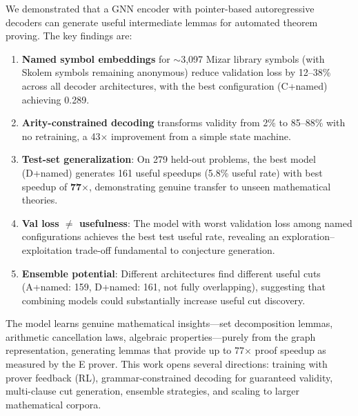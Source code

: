 \documentclass{article}
\begin{document}
We demonstrated that a GNN encoder with pointer-based autoregressive decoders can
generate useful intermediate lemmas for automated theorem proving. The key findings
are:

\begin{enumerate}
\item \textbf{Named symbol embeddings} for ${\sim}$3,097 Mizar library symbols
      (with Skolem symbols remaining anonymous) reduce validation loss by 12--38\%
      across all decoder architectures, with the best configuration (C+named)
      achieving 0.289.

\item \textbf{Arity-constrained decoding} transforms validity from 2\% to 85--88\%
      with no retraining, a 43$\times$ improvement from a simple state machine.

\item \textbf{Test-set generalization}: On 279 held-out problems, the best model
      (D+named) generates 161 useful speedups (5.8\% useful rate) with best
      speedup of \textbf{77$\times$}, demonstrating genuine transfer to unseen
      mathematical theories.

\item \textbf{Val loss $\neq$ usefulness}: The model with worst validation loss
      among named configurations achieves the best test useful rate, revealing
      an exploration--exploitation trade-off fundamental to conjecture generation.

\item \textbf{Ensemble potential}: Different architectures find different useful
      cuts (A+named: 159, D+named: 161, not fully overlapping), suggesting that
      combining models could substantially increase useful cut discovery.
\end{enumerate}

The model learns genuine mathematical insights---set decomposition lemmas,
arithmetic cancellation laws, algebraic properties---purely from the graph
representation, generating lemmas that provide up to 77$\times$ proof speedup
as measured by the E prover. This work opens several directions: training with
prover feedback (RL), grammar-constrained decoding for guaranteed validity,
multi-clause cut generation, ensemble strategies, and scaling to larger
mathematical corpora.


\end{document}
